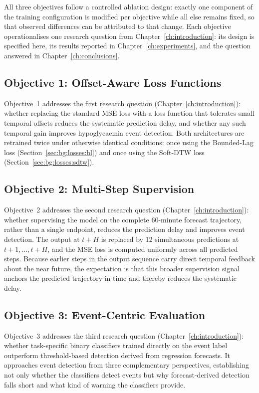 All three objectives follow a controlled ablation design: exactly one component of the training configuration is modified per objective while all else remains fixed, so that observed differences can be attributed to that change. Each objective operationalises one research question from Chapter~\ref{ch:introduction}: its design is specified here, its results reported in Chapter~\ref{ch:experiments}, and the question answered in Chapter~\ref{ch:conclusions}.

\subsection{Objective 1: Offset-Aware Loss Functions} \label{sec:method:obj1}

Objective~1 addresses the first research question (Chapter~\ref{ch:introduction}): whether replacing the standard MSE loss with a loss function that tolerates small temporal offsets reduces the systematic prediction delay, and whether any such temporal gain improves hypoglycaemia event detection. Both architectures are retrained twice under otherwise identical conditions: once using the Bounded-Lag loss (Section~\ref{sec:bg:losses:bl}) and once using the Soft-DTW loss (Section~\ref{sec:bg:losses:sdtw}).

\subsection{Objective 2: Multi-Step Supervision} \label{sec:method:obj2}

Objective~2 addresses the second research question (Chapter~\ref{ch:introduction}): whether supervising the model on the complete 60-minute forecast trajectory, rather than a single endpoint, reduces the prediction delay and improves event detection. The output at $t+H$ is replaced by 12 simultaneous predictions at $t+1, \ldots, t+H$, and the MSE loss is computed uniformly across all predicted steps. Because earlier steps in the output sequence carry direct temporal feedback about the near future, the expectation is that this broader supervision signal anchors the predicted trajectory in time and thereby reduces the systematic delay.

\subsection{Objective 3: Event-Centric Evaluation} \label{sec:method:obj3}

Objective~3 addresses the third research question (Chapter~\ref{ch:introduction}): whether task-specific binary classifiers trained directly on the event label outperform threshold-based detection derived from regression forecasts. It approaches event detection from three complementary perspectives, establishing not only whether the classifiers detect events but why forecast-derived detection falls short and what kind of warning the classifiers provide.

